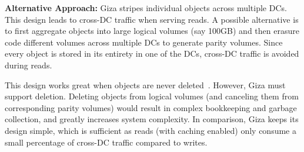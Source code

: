 {\bf Alternative Approach:} Giza stripes individual objects across multiple DCs. This design leads to cross-DC traffic when serving reads. A possible alternative is to first aggregate objects into large logical volumes (say 100GB) and then erasure code different volumes across multiple DCs to generate parity volumes. Since every object is stored in its entirety in one of the DCs, cross-DC traffic is avoided during reads.

This design works great when objects are never deleted~\cite{f4:osdi14}. However, Giza must support deletion. Deleting objects from logical volumes (and canceling them from corresponding parity volumes) would result in complex bookkeeping and garbage collection, and greatly increases system complexity. In comparison, Giza keeps its design simple, which is sufficient as reads (with caching enabled) only consume a small percentage of cross-DC traffic compared to writes.

